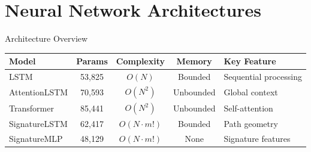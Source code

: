\documentclass[aspectratio=169,11pt]{beamer}
\begin{document}
\section{Neural Network Architectures}

\begin{frame}{Architecture Overview}
\begin{table}
\centering
\small
\begin{tabular}{lcccl}
\toprule
\textbf{Model} & \textbf{Params} & \textbf{Complexity} & \textbf{Memory} & \textbf{Key Feature} \\
\midrule
LSTM & 53,825 & $O(N)$ & Bounded & Sequential processing \\
AttentionLSTM & 70,593 & $O(N^2)$ & Unbounded & Global context \\
Transformer & 85,441 & $O(N^2)$ & Unbounded & Self-attention \\
SignatureLSTM & 62,417 & $O(N \cdot m!)$ & Bounded & Path geometry \\
SignatureMLP & 48,129 & $O(N \cdot m!)$ & None & Signature features \\
\bottomrule
\end{tabular}
\end{table}
\end{frame}
\end{document}
